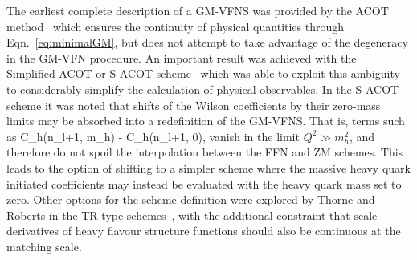 The earliest complete description of a GM-VFNS was provided by the ACOT method~\cite{Collins:1978wz} which ensures the continuity of physical quantities through Eqn.~\ref{eq:minimalGM}, but does not attempt to take advantage of the degeneracy in the GM-VFN procedure. An important result was achieved with the Simplified-ACOT or S-ACOT  scheme~\cite{Collins:1998rz,Kramer:2000hn} which was able to exploit this ambiguity to considerably simplify the calculation of physical observables. In the S-ACOT scheme it was noted that shifts of the Wilson coefficients by their zero-mass limits may be absorbed into a redefinition of the GM-VFNS. That is, terms such as
\be C_h(n_l+1, m_h) - C_h(n_l+1, 0),\ee
vanish in the limit $Q^2 \gg m_h^2$, and therefore do not spoil the interpolation between the FFN and ZM schemes. This leads to the option of shifting to a simpler scheme where the massive heavy quark initiated coefficients may instead be evaluated with the heavy quark mass set to zero. Other options for the scheme definition were explored by Thorne and Roberts in the TR type schemes~\cite{Thorne:1997uu,Thorne:1997ga}, with the additional constraint that scale derivatives of heavy flavour structure functions should also be continuous at the matching scale.
%
